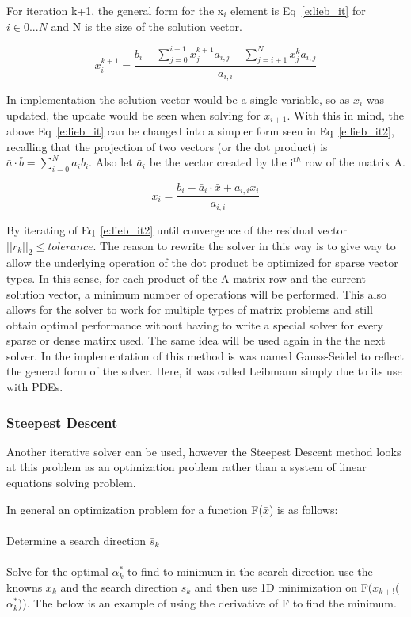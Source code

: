 \documentclass[]{aiaa-tc}%
\begin{document}
For iteration k+1, the general form for the x$_i$ element is Eq~\ref{e:lieb_it} for $i\in 0...N$
and N is the size of the solution vector.

\begin{equation}
  \label{e:lieb_it}
  x_i^{k+1} = \frac {b_i - \sum_{j=0}^{i-1} x_j^{k+1} a_{i,j} - \sum_{j=i+1}^{N} x_j^k a_{i,j}}{a_{i,i}}
\end{equation}

In implementation the solution vector would be a single variable, so as $x_i$ was
updated, the update would be seen when solving for $x_{i+1}$. With this in mind,
the above Eq~\ref{e:lieb_it} can be changed into a simpler form seen in Eq~\ref{e:lieb_it2},
recalling that the projection of two vectors (or the dot product) is
$\bar a \cdotp \bar b = \sum_{i=0}^{N} a_i b_i$. Also let $\bar a_i$ be the vector
created by the i$^{th}$ row of the matrix A.

\begin{equation}
  \label{e:lieb_it2}
  x_i = \frac {b_i - \bar a_{i} \cdotp \bar x + a_{i,i} x_i}{a_{i,i}}
\end{equation}

By iterating of Eq~\ref{e:lieb_it2} until convergence of the residual vector
$\vert\vert r_k \vert\vert_2 \leq tolerance$.
The reason to rewrite the solver in this way is to give way to allow the underlying
operation of the dot product be optimized for sparse vector types. In this sense, for
each product of the A matrix row and the current solution vector, a minimum number
of operations will be performed. This also allows for the solver to work for multiple
types of matrix problems and still obtain optimal performance without having to
write a special solver for every sparse or dense matirx used. The same idea will
be used again in the the next solver. In the implementation of this method is was named
Gauss-Seidel to reflect the general form of the solver. Here, it was called Leibmann
simply due to its use with PDEs.

\subsubsection{Steepest Descent}
Another iterative solver can be used, however the Steepest Descent method looks
at this problem as an optimization problem rather than a system of linear equations
solving problem.

In general an optimization problem for a function F($\bar x$) is as follows:
\\\\
Determine a search direction $\bar s_k$
\\\\
Solve for the optimal $\alpha_k^{*}$ to find to minimum in the search direction
use the knowns $\bar x_k$ and the search direction $\bar s_k$ and then use 1D minimization
on F($x_{k+!}$($\alpha_k^{*}$)). The below is an example of using the derivative
of F to find the minimum.
\end{document}
